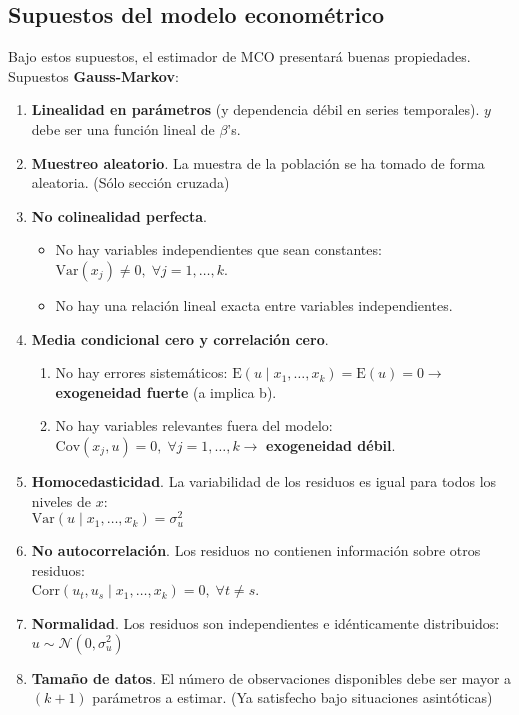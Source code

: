 \documentclass[10pt, a4paper, landscape]{extarticle}
\newcommand{\E}{\mathrm{E}}
\newcommand{\Var}{\mathrm{Var}}
\newcommand{\Cov}{\mathrm{Cov}}
\newcommand{\Corr}{\mathrm{Corr}}
\begin{document}
\begin{multicols}{3}
\subsection*{Supuestos del modelo econométrico}

Bajo estos supuestos, el estimador de MCO presentará buenas propiedades. Supuestos \textbf{Gauss-Markov}:

\begin{enumerate}[leftmargin=*]
	\item \textbf{Linealidad en parámetros} (y dependencia débil en series temporales). $y$ debe ser una función lineal de $\beta$'s.
	\item \textbf{Muestreo aleatorio}. La muestra de la población se ha tomado de forma aleatoria. (Sólo sección cruzada)
	\item \textbf{No colinealidad perfecta}.
	\begin{itemize}[leftmargin=*]
		\item No hay variables independientes que sean constantes: $\Var(x_j) \neq 0, \; \forall j = 1, \ldots, k$.
		\item No hay una relación lineal exacta entre variables independientes.
	\end{itemize}
	\item \textbf{Media condicional cero y correlación cero}.
	\begin{enumerate}[leftmargin=*, label=\alph*.]
		\item No hay errores sistemáticos: $\E(u \mid x_1, \ldots, x_k) = \E(u) = 0 \rightarrow$ \textbf{exogeneidad fuerte} (a implica b).
		\item No hay variables relevantes fuera del modelo: $\Cov(x_j, u) = 0, \; \forall j = 1, \ldots, k \rightarrow$ \textbf{exogeneidad débil}.
	\end{enumerate}
	\item \textbf{Homocedasticidad}. La variabilidad de los residuos es igual para todos los niveles de $x$: \\ $\Var(u \mid x_1, \ldots, x_k) = \sigma^2_u$
	\item \textbf{No autocorrelación}. Los residuos no contienen información sobre otros residuos: \\ $\Corr(u_t, u_s \mid x_1, \ldots, x_k) = 0, \; \forall t \neq s$.
	\item \textbf{Normalidad}. Los residuos son independientes e idénticamente distribuidos: $u \sim \mathcal{N} (0, \sigma^2_u)$
	\item \textbf{Tamaño de datos}. El número de observaciones disponibles debe ser mayor a $(k + 1)$ parámetros a estimar. (Ya satisfecho bajo situaciones asintóticas)
\end{enumerate}


\end{multicols}
\end{document}
